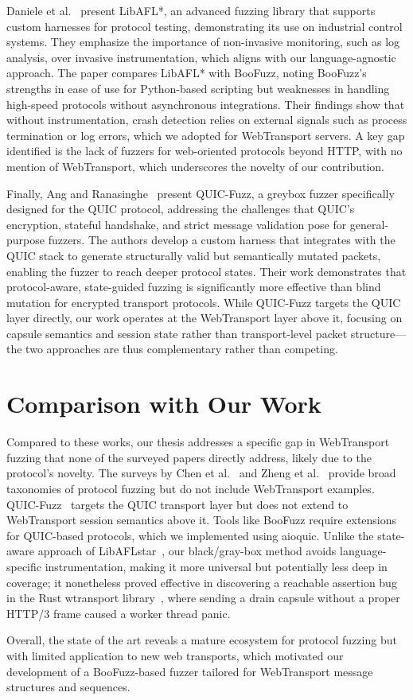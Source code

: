 Daniele et al.~\cite{daniele2024libafl} present LibAFL*, an advanced fuzzing library that supports custom harnesses for protocol testing, demonstrating its use on industrial control systems. They emphasize the importance of non-invasive monitoring, such as log analysis, over invasive instrumentation, which aligns with our language-agnostic approach. The paper compares LibAFL* with BooFuzz, noting BooFuzz's strengths in ease of use for Python-based scripting but weaknesses in handling high-speed protocols without asynchronous integrations. Their findings show that without instrumentation, crash detection relies on external signals such as process termination or log errors, which we adopted for WebTransport servers. A key gap identified is the lack of fuzzers for web-oriented protocols beyond HTTP, with no mention of WebTransport, which underscores the novelty of our contribution.

Finally, Ang and Ranasinghe~\cite{li2024fuzzing} present QUIC-Fuzz, a greybox fuzzer specifically designed for the QUIC protocol, addressing the challenges that QUIC's encryption, stateful handshake, and strict message validation pose for general-purpose fuzzers. The authors develop a custom harness that integrates with the QUIC stack to generate structurally valid but semantically mutated packets, enabling the fuzzer to reach deeper protocol states. Their work demonstrates that protocol-aware, state-guided fuzzing is significantly more effective than blind mutation for encrypted transport protocols. While QUIC-Fuzz targets the QUIC layer directly, our work operates at the WebTransport layer above it, focusing on capsule semantics and session state rather than transport-level packet structure---the two approaches are thus complementary rather than competing.

\section{Comparison with Our Work}

Compared to these works, our thesis addresses a specific gap in WebTransport fuzzing that none of the surveyed papers directly address, likely due to the protocol's novelty. The surveys by Chen et al.~\cite{chen2024survey} and Zheng et al.~\cite{wang2024enhancing} provide broad taxonomies of protocol fuzzing but do not include WebTransport examples. QUIC-Fuzz~\cite{li2024fuzzing} targets the QUIC transport layer but does not extend to WebTransport session semantics above it. Tools like BooFuzz require extensions for QUIC-based protocols, which we implemented using aioquic. Unlike the state-aware approach of LibAFLstar~\cite{daniele2024libafl}, our black/gray-box method avoids language-specific instrumentation, making it more universal but potentially less deep in coverage; it nonetheless proved effective in discovering a reachable assertion bug in the Rust wtransport library~\cite{wtransport_github}, where sending a drain capsule without a proper HTTP/3 frame caused a worker thread panic.

Overall, the state of the art reveals a mature ecosystem for protocol fuzzing but with limited application to new web transports, which motivated our development of a BooFuzz-based fuzzer tailored for WebTransport message structures and sequences.
